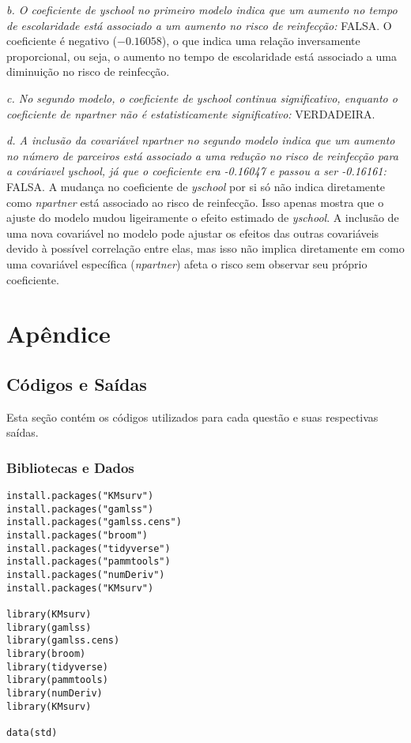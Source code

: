 \documentclass[a4paper,12pt]{article}
\begin{document}
\textit{b. O coeficiente de yschool no primeiro modelo indica que um aumento no tempo de escolaridade está associado a um aumento no risco de reinfecção:} FALSA. O coeficiente é negativo ($-0.16058$), o que indica uma relação inversamente proporcional, ou seja, o aumento no tempo de escolaridade está associado a uma diminuição no risco de reinfecção.

\textit{c. No segundo modelo, o coeficiente de yschool continua significativo, enquanto o coeficiente de npartner não é estatisticamente significativo:} VERDADEIRA.

\textit{d. A inclusão da covariável npartner no segundo modelo indica que um aumento no número de parceiros está associado a uma redução no risco de reinfecção para a cováriavel yschool, já que o coeficiente era -0.16047 e passou a ser -0.16161:} FALSA. A mudança no coeficiente de \textit{yschool} por si só não indica diretamente como \textit{npartner} está associado ao risco de reinfecção. Isso apenas mostra que o ajuste do modelo mudou ligeiramente o efeito estimado de \textit{yschool}.  A inclusão de uma nova covariável no modelo pode ajustar os efeitos das outras covariáveis devido à possível correlação entre elas, mas isso não implica diretamente em como uma covariável específica (\textit{npartner}) afeta o risco sem observar seu próprio coeficiente.

\onecolumn
\appendix
\section{Apêndice}
\subsection{Códigos e Saídas}
Esta seção contém os códigos utilizados para cada questão e suas respectivas saídas.

\subsubsection{Bibliotecas e Dados}

\begin{lstlisting}
install.packages("KMsurv")
install.packages("gamlss")
install.packages("gamlss.cens")
install.packages("broom")
install.packages("tidyverse")
install.packages("pammtools")
install.packages("numDeriv")
install.packages("KMsurv")

library(KMsurv)
library(gamlss)
library(gamlss.cens)
library(broom)
library(tidyverse)
library(pammtools)
library(numDeriv)
library(KMsurv)

data(std)
\end{lstlisting}
\end{document}
